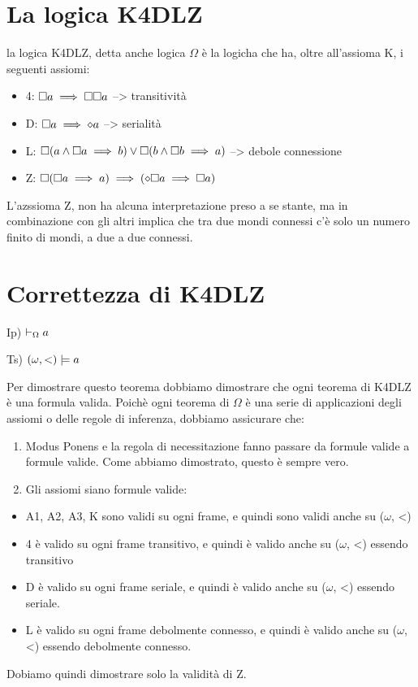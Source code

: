 \section{La logica K4DLZ}

la logica K4DLZ, detta anche logica $\Omega$ è la logicha che ha,
oltre all'assioma K, i seguenti assiomi:
\begin{itemize}
\item 4: $\square a\implies\square\square a$ --> transitività
\item D: $\square a\implies\diamond a$ --> serialità
\item L: $\square(a\wedge\square a\implies b)\vee\square(b\wedge\square b\implies a)$
--> debole connessione
\item Z: $\square(\square a\implies a)\implies(\diamond\square a\implies\square a)$
\end{itemize}
L'azssioma Z, non ha alcuna interpretazione preso a se stante, ma
in combinazione con gli altri implica che tra due mondi connessi c'è
solo un numero finito di mondi, a due a due connessi.


\section{Correttezza di K4DLZ}

Ip) $\vdash_{\Omega}a$

Ts) $(\omega,<)\models a$

Per dimostrare questo teorema dobbiamo dimostrare che ogni teorema
di K4DLZ è una formula valida. Poichè ogni teorema di $\Omega$ è
una serie di applicazioni degli assiomi o delle regole di inferenza,
dobbiamo assicurare che:
\begin{enumerate}
\item Modus Ponens e la regola di necessitazione fanno passare da formule
valide a formule valide. Come abbiamo dimostrato, questo è sempre
vero.
\item Gli assiomi siano formule valide:\end{enumerate}
\begin{itemize}
\item A1, A2, A3, K sono validi su ogni frame, e quindi sono validi anche
su ($\omega$, <)
\item 4 è valido su ogni frame transitivo, e quindi è valido anche su ($\omega$,
<) essendo transitivo
\item D è valido su ogni frame seriale, e quindi è valido anche su ($\omega$,
<) essendo seriale.
\item L è valido su ogni frame debolmente connesso, e quindi è valido anche
su ($\omega$, <) essendo debolmente connesso.\\

\end{itemize}
Dobiamo quindi dimostrare solo la validità di Z.

